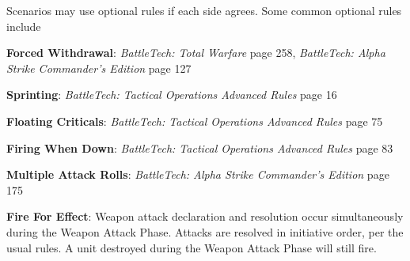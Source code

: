 Scenarios may use optional rules if each side agrees.
Some common optional rules include

\begin{description}

\item {\bfseries Forced Withdrawal}: \emph{BattleTech: Total Warfare} page 258, \emph{BattleTech: Alpha Strike Commander's Edition} page 127

\item {\bfseries Sprinting}: \emph{BattleTech: Tactical Operations Advanced Rules} page 16

\item {\bfseries Floating Criticals}: \emph{BattleTech: Tactical Operations Advanced Rules} page 75

\item {\bfseries Firing When Down}: \emph{BattleTech: Tactical Operations Advanced Rules} page 83

\item {\bfseries Multiple Attack Rolls}: \emph{BattleTech: Alpha Strike Commander's Edition} page 175

\item {\bfseries Fire For Effect}: Weapon attack declaration and resolution occur simultaneously during the Weapon Attack Phase.
Attacks are resolved in initiative order, per the usual rules.
A unit destroyed during the Weapon Attack Phase will still fire.

\end{description}
